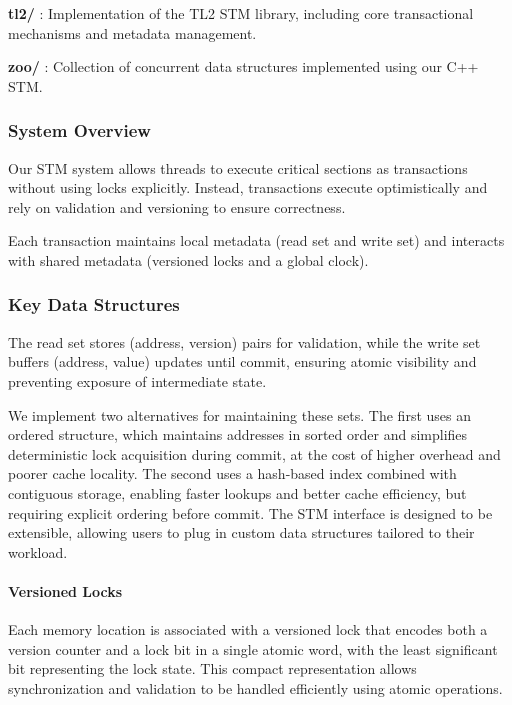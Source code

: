 \documentclass[11pt,a4paper]{article}
\begin{document}
\textbf{tl2/} : Implementation of the TL2 STM library, including core transactional mechanisms and metadata management.

\textbf{zoo/} : Collection of concurrent data structures implemented using our C++ STM.

\subsubsection{System Overview}

Our STM system allows threads to execute critical sections as transactions without using locks explicitly. Instead, transactions execute optimistically and rely on validation and versioning to ensure correctness.

Each transaction maintains local metadata (read set and write set) and interacts with shared metadata (versioned locks and a global clock).

\subsubsection{Key Data Structures}

The read set stores (address, version) pairs for validation, while the write set buffers (address, value) updates until commit, ensuring atomic visibility and preventing exposure of intermediate state.

We implement two alternatives for maintaining these sets. The first uses an ordered structure, which maintains addresses in sorted order and simplifies deterministic lock acquisition during commit, at the cost of higher overhead and poorer cache locality. The second uses a hash-based index combined with contiguous storage, enabling faster lookups and better cache efficiency, but requiring explicit ordering before commit. The STM interface is designed to be extensible, allowing users to plug in custom data structures tailored to their workload.

\paragraph{Versioned Locks}

Each memory location is associated with a versioned lock that encodes both a version counter and a lock bit in a single atomic word, with the least significant bit representing the lock state. This compact representation allows synchronization and validation to be handled efficiently using atomic operations.
\end{document}
